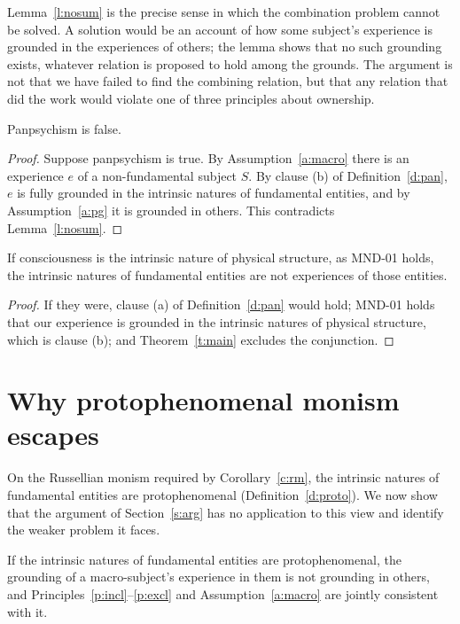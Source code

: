 \documentclass{situationist-preprint}
\begin{document}
Lemma~\ref{l:nosum} is the precise sense in which the combination problem cannot be solved. A solution would be an account of how some subject's experience is grounded in the experiences of others; the lemma shows that no such grounding exists, whatever relation is proposed to hold among the grounds. The argument is not that we have failed to find the combining relation, but that any relation that did the work would violate one of three principles about ownership.

\begin{theorem}\label{t:main}
Panpsychism is false.
\end{theorem}

\begin{proof}
Suppose panpsychism is true. By Assumption~\ref{a:macro} there is an experience $e$ of a non-fundamental subject $S$. By clause (b) of Definition~\ref{d:pan}, $e$ is fully grounded in the intrinsic natures of fundamental entities, and by Assumption~\ref{a:pg} it is grounded in others. This contradicts Lemma~\ref{l:nosum}.
\end{proof}

\begin{corollary}\label{c:rm}
If consciousness is the intrinsic nature of physical structure, as MND-01 holds, the intrinsic natures of fundamental entities are not experiences of those entities.
\end{corollary}

\begin{proof}
If they were, clause (a) of Definition~\ref{d:pan} would hold; MND-01 holds that our experience is grounded in the intrinsic natures of physical structure, which is clause (b); and Theorem~\ref{t:main} excludes the conjunction.
\end{proof}

\section{Why protophenomenal monism escapes}\label{s:proto}

On the Russellian monism required by Corollary~\ref{c:rm}, the intrinsic natures of fundamental entities are protophenomenal (Definition~\ref{d:proto}). We now show that the argument of Section~\ref{s:arg} has no application to this view and identify the weaker problem it faces.

\begin{proposition}\label{p:escape}
If the intrinsic natures of fundamental entities are protophenomenal, the grounding of a macro-subject's experience in them is not grounding in others, and Principles~\ref{p:incl}--\ref{p:excl} and Assumption~\ref{a:macro} are jointly consistent with it.
\end{proposition}
\end{document}
